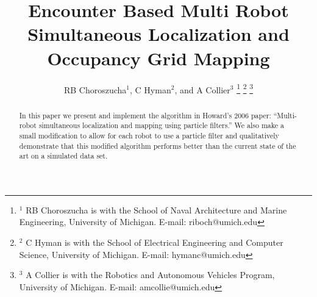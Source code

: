 \documentclass[letterpaper, 10 pt, conference]{ieeeconf}  %
\title{Encounter Based Multi Robot Simultaneous Localization and Occupancy Grid Mapping}
\author{RB Choroszucha$^{1}$, C Hyman$^{2}$, and A Collier$^{3}$ %
\thanks{$^{1}$ RB Choroszucha is with the School of Naval Architecture and Marine Engineering, University of Michigan.  E-mail: riboch{@}umich.edu}%
\thanks{$^{2}$ C Hyman is with the School of Electrical Engineering and Computer Science, University of Michigan. E-mail: {hymanc}{@}umich.edu}
\thanks{$^{3}$ A Collier is with the Robotics and Autonomous Vehicles Program, University of Michigan. E-mail: {amcollie}{@}umich.edu}
}
\begin{document}
\maketitle
\thispagestyle{empty}
\pagestyle{empty}


\begin{abstract}

In this paper we present and implement the algorithm in Howard's 2006 paper: ``Multi-robot simultaneous localization and mapping using particle filters.''  We also make a small modification to allow for each robot to use a particle filter and qualitatively demonstrate that this modified algorithm performs better than the current state of the art on a simulated data set.

\end{abstract}
















\addtolength{\textheight}{-12cm}   %







\end{document}
